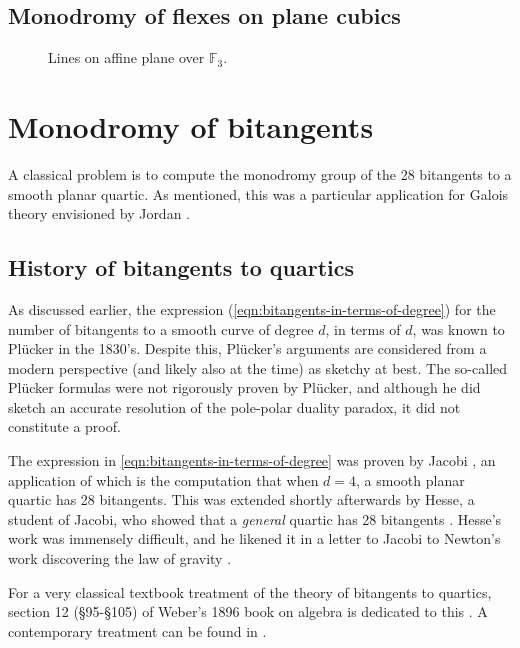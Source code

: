 \documentclass[11pt]{amsart}
\begin{document}
\subsection{Monodromy of flexes on plane cubics}

\begin{figure}
    
    \caption{Lines on affine plane over $\mathbb{F}_3$.}
    \label{fig: A2 F3}
\end{figure}


\section{Monodromy of bitangents}

A classical problem is to compute the monodromy group of the 28 bitangents to a smooth planar quartic. As mentioned, this was a particular application for Galois theory envisioned by Jordan \cite[III.VI]{Jordan}.

\subsection{History of bitangents to quartics}

As discussed earlier, the expression (\autoref{eqn:bitangents-in-terms-of-degree}) for the number of bitangents to a smooth curve of degree $d$, in terms of $d$, was known to Pl\"{u}cker in the 1830's. Despite this, Pl\"{u}cker's arguments are considered from a modern perspective (and likely also at the time) as sketchy at best. The so-called Pl\"{u}cker formulas were not rigorously proven by Pl\"{u}cker, and although he did sketch an accurate resolution of the pole-polar duality paradox, it did not constitute a proof.

The expression in \autoref{eqn:bitangents-in-terms-of-degree} was proven by Jacobi \cite{Jacobi1850}, an application of which is the computation that when $d=4$, a smooth planar quartic has 28 bitangents. This was extended shortly afterwards by Hesse, a student of Jacobi, who showed that a \textit{general} quartic has 28 bitangents \cite{Hesse1855}. Hesse's work was immensely difficult, and he likened it in a letter to Jacobi to Newton's work discovering the law of gravity \cite[p.~165]{Gray-worlds}.

For a very classical textbook treatment of the theory of bitangents to quartics, section 12 (\S95-\S105) of Weber's 1896 book on algebra is dedicated to this \cite[\S95-\S105]{Weber1896}. A contemporary treatment can be found in \cite[\S6.1]{Dolgachev}.
\end{document}
